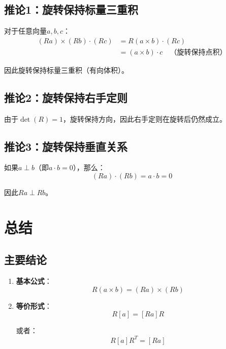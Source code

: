 \documentclass[12pt,a4paper]{article}
\begin{document}
\subsection{推论1：旋转保持标量三重积}

对于任意向量$a, b, c$：
\begin{align}
(Ra) \times (Rb) \cdot (Rc) &= R(a \times b) \cdot (Rc) \\
&= (a \times b) \cdot c \quad \text{（旋转保持点积）}
\end{align}

因此旋转保持标量三重积（有向体积）。

\subsection{推论2：旋转保持右手定则}

由于$\det(R) = 1$，旋转保持方向，因此右手定则在旋转后仍然成立。

\subsection{推论3：旋转保持垂直关系}

如果$a \perp b$（即$a \cdot b = 0$），那么：
\begin{equation}
(Ra) \cdot (Rb) = a \cdot b = 0
\end{equation}

因此$Ra \perp Rb$。

\section{总结}

\subsection{主要结论}

\begin{enumerate}
\item \textbf{基本公式}：
\begin{equation}
R(a \times b) = (Ra) \times (Rb)
\end{equation}

\item \textbf{等价形式}：
\begin{equation}
R [a] = [Ra] R
\end{equation}

或者：
\begin{equation}
R [a] R^T = [Ra]
\end{equation}
\end{enumerate}
\end{document}
